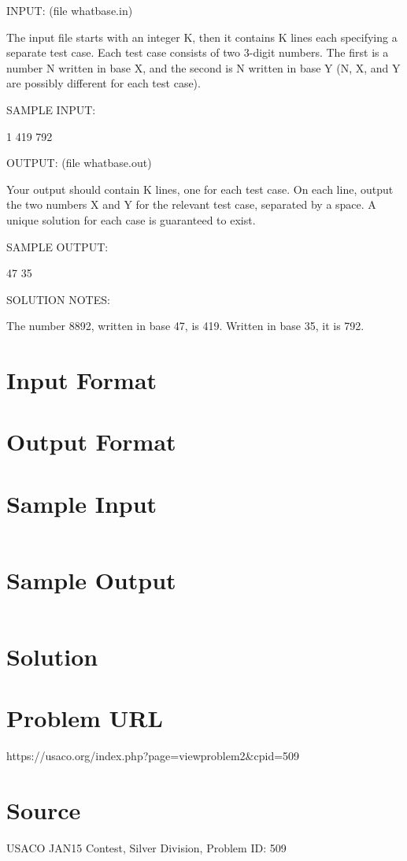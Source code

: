 \documentclass[12pt]{article}
\begin{document}
INPUT: (file whatbase.in)

The input file starts with an integer K, then it contains K lines each
specifying a separate test case.  Each test case consists of two
3-digit numbers.  The first is a number N written in base X, and the
second is N written in base Y (N, X, and Y are possibly different for
each test case).

SAMPLE INPUT:

1
419 792

OUTPUT: (file whatbase.out)

Your output should contain K lines, one for each test case.  On each
line, output the two numbers X and Y for the relevant test case,
separated by a space.  A unique solution for each case is guaranteed
to exist.

SAMPLE OUTPUT:

47 35

SOLUTION NOTES:

The number 8892, written in base 47, is 419.  Written in base 35, it is
792.



\section*{Input Format}


\section*{Output Format}


\section*{Sample Input}
\begin{verbatim}

\end{verbatim}

\section*{Sample Output}
\begin{verbatim}

\end{verbatim}

\section*{Solution}


\section*{Problem URL}
https://usaco.org/index.php?page=viewproblem2&cpid=509

\section*{Source}
USACO JAN15 Contest, Silver Division, Problem ID: 509
\end{document}
